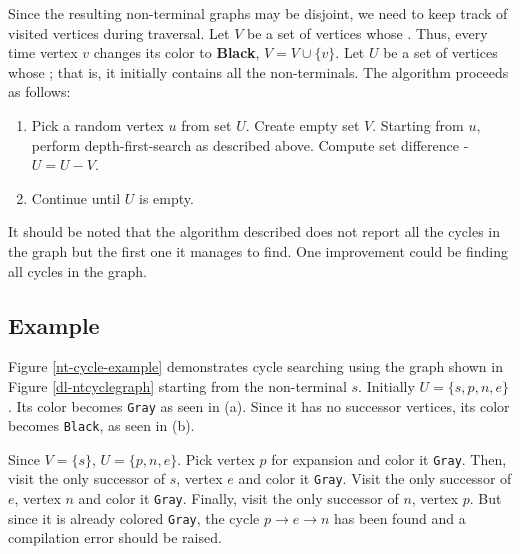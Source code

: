 Since the resulting non-terminal graphs may be disjoint, we need to keep track of visited vertices during traversal. Let $V$ be a set of vertices whose . Thus, every time vertex $v$ changes its color to \textbf{Black}, $V = V \cup \{v\} $. Let $U$ be a set of vertices whose ; that is, it initially contains all the non-terminals. The algorithm proceeds as follows:

\begin{enumerate}
\item
Pick a random vertex $u$ from set $U$. Create empty set $V$. Starting from $u$, perform depth-first-search as described above. Compute set difference - $U = U-V$.
\item
Continue until $U$ is empty.
\end{enumerate}

It should be noted that the algorithm described does not report all the cycles in the graph but the first one it manages to find. One improvement could be finding all cycles in the graph.

\subsection{Example}

Figure \ref{nt-cycle-example} demonstrates cycle searching using the graph shown in Figure \ref{dl-ntcyclegraph} starting from the non-terminal $s$. Initially $U=\{s,p,n,e\}$. Its color becomes \texttt{Gray} as seen in (a). Since it has no successor vertices, its color becomes \texttt{Black}, as seen in (b).

Since $V = \{ s \}$, $U=\{p,n,e\}$. Pick vertex $p$ for expansion and color it \texttt{Gray}. Then, visit the only successor of $s$, vertex $e$ and color it \texttt{Gray}. Visit the only successor of $e$, vertex $n$ and color it \texttt{Gray}. Finally, visit the only successor of $n$, vertex $p$. But since it is already colored \texttt{Gray}, the cycle  $p \rightarrow e \rightarrow n$ has been found and a compilation error should be raised.

